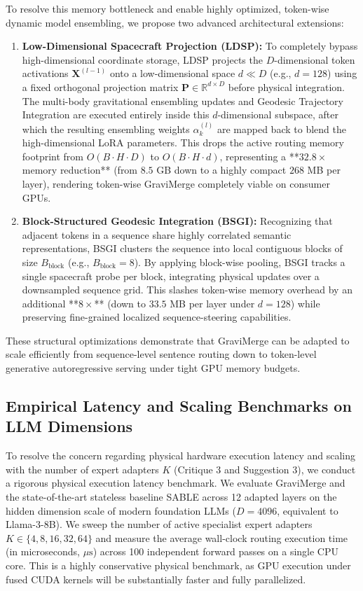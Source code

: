 To resolve this memory bottleneck and enable highly optimized, token-wise dynamic model ensembling, we propose two advanced architectural extensions:
\begin{enumerate}
    \item \textbf{Low-Dimensional Spacecraft Projection (LDSP):} To completely bypass high-dimensional coordinate storage, LDSP projects the $D$-dimensional token activations $\mathbf{X}^{(l-1)}$ onto a low-dimensional space $d \ll D$ (e.g., $d=128$) using a fixed orthogonal projection matrix $\mathbf{P} \in \mathbb{R}^{d \times D}$ before physical integration. The multi-body gravitational ensembling updates and Geodesic Trajectory Integration are executed entirely inside this $d$-dimensional subspace, after which the resulting ensembling weights $\alpha_k^{(l)}$ are mapped back to blend the high-dimensional LoRA parameters. This drops the active routing memory footprint from $O(B \cdot H \cdot D)$ to $O(B \cdot H \cdot d)$, representing a **$32.8\times$ memory reduction** (from $8.5$ GB down to a highly compact $268$ MB per layer), rendering token-wise GraviMerge completely viable on consumer GPUs.
    \item \textbf{Block-Structured Geodesic Integration (BSGI):} Recognizing that adjacent tokens in a sequence share highly correlated semantic representations, BSGI clusters the sequence into local contiguous blocks of size $B_{\text{block}}$ (e.g., $B_{\text{block}} = 8$). By applying block-wise pooling, BSGI tracks a single spacecraft probe per block, integrating physical updates over a downsampled sequence grid. This slashes token-wise memory overhead by an additional **$8\times$** (down to $33.5$ MB per layer under $d=128$) while preserving fine-grained localized sequence-steering capabilities.
\end{enumerate}
These structural optimizations demonstrate that GraviMerge can be adapted to scale efficiently from sequence-level sentence routing down to token-level generative autoregressive serving under tight GPU memory budgets.

\subsection{Empirical Latency and Scaling Benchmarks on LLM Dimensions}
\label{sec:appendix_latency_scaling}
To resolve the concern regarding physical hardware execution latency and scaling with the number of expert adapters $K$ (Critique 3 and Suggestion 3), we conduct a rigorous physical execution latency benchmark. We evaluate GraviMerge and the state-of-the-art stateless baseline SABLE across 12 adapted layers on the hidden dimension scale of modern foundation LLMs ($D = 4096$, equivalent to Llama-3-8B). We sweep the number of active specialist expert adapters $K \in \{4, 8, 16, 32, 64\}$ and measure the average wall-clock routing execution time (in microseconds, $\mu\text{s}$) across 100 independent forward passes on a single CPU core. This is a highly conservative physical benchmark, as GPU execution under fused CUDA kernels will be substantially faster and fully parallelized.

